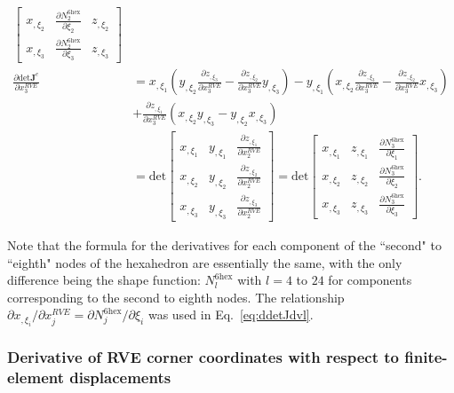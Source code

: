 \begin{align}
\begin{bmatrix}
x_{,\xi_2} & \frac{\partial N_2^{6\text{hex}}}{\partial \xi_2} & z_{,\xi_2} \\
x_{,\xi_3} & \frac{\partial N_2^{6\text{hex}}}{\partial \xi_3} &  z_{,\xi_3}
\end{bmatrix} \nonumber\\
\frac{\partial \text{det}\pmb{J}^e}{\partial x_3^{RVE}} &= x_{,\xi_1}\left(y_{,\xi_2} \frac{\partial z_{,\xi_3}}{\partial x_3^{RVE}} - \frac{\partial z_{,\xi_2}}{\partial x_3^{RVE}} y_{,\xi_3} \right) - y_{,\xi_1}\left(x_{,\xi_2}\frac{\partial z_{,\xi_3}}{\partial x_3^{RVE}} - \frac{\partial z_{,\xi_2}}{\partial x_3^{RVE}} x_{,\xi_3} \right) \nonumber \\
& + \frac{\partial z_{,\xi_1}}{\partial x_3^{RVE}}\left(x_{,\xi_2}y_{,\xi_3}-y_{,\xi_2}x_{,\xi_3} \right) \nonumber\\
&= \text{det} \begin{bmatrix}
x_{,\xi_1} & y_{,\xi_1} & \frac{\partial z_{,\xi_1}}{\partial x_2^{RVE}}  \\
x_{,\xi_2} & y_{,\xi_2} & \frac{\partial z_{,\xi_2}}{\partial x_2^{RVE}}  \\
x_{,\xi_3} & y_{,\xi_3} & \frac{\partial z_{,\xi_3}}{\partial x_2^{RVE}} 
\end{bmatrix} 
= \text{det} \begin{bmatrix}
x_{,\xi_1} & z_{,\xi_1} & \frac{\partial N_3^{6\text{hex}}}{\partial \xi_1}  \\
x_{,\xi_2} & z_{,\xi_2} & \frac{\partial N_3^{6\text{hex}}}{\partial \xi_2}  \\
x_{,\xi_3} & z_{,\xi_3}& \frac{\partial N_3^{6\text{hex}}}{\partial \xi_3} 
\end{bmatrix} .
\label{eq:ddetJdvl}
\end{align}

%
Note that the formula for the derivatives for each component of the ``second" to ``eighth" nodes of the hexahedron are essentially the same, with the only difference being the shape function: $N_{l}^{6\text{hex}}$ with $l=4$ to $24$ for components corresponding to the second to eighth nodes. The relationship $\partial x_{,\xi_i}/\partial x_j^{RVE} = \partial N_j^{6\text{hex}}/\partial \xi_i$ was used in Eq.\ \eqref{eq:ddetJdvl}.

\subsubsection{Derivative of RVE corner coordinates with respect to finite-element displacements}

